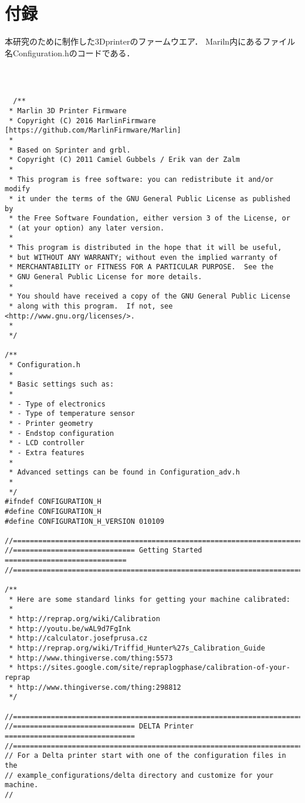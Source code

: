 \chapter{付録}
\label{chp:first}
本研究のために制作した3Dprinterのファームウエア．
Mariln内にあるファイル名Configuration.hのコードである． 


\begin{lstlisting}



  /**
 * Marlin 3D Printer Firmware
 * Copyright (C) 2016 MarlinFirmware [https://github.com/MarlinFirmware/Marlin]
 *
 * Based on Sprinter and grbl.
 * Copyright (C) 2011 Camiel Gubbels / Erik van der Zalm
 *
 * This program is free software: you can redistribute it and/or modify
 * it under the terms of the GNU General Public License as published by
 * the Free Software Foundation, either version 3 of the License, or
 * (at your option) any later version.
 *
 * This program is distributed in the hope that it will be useful,
 * but WITHOUT ANY WARRANTY; without even the implied warranty of
 * MERCHANTABILITY or FITNESS FOR A PARTICULAR PURPOSE.  See the
 * GNU General Public License for more details.
 *
 * You should have received a copy of the GNU General Public License
 * along with this program.  If not, see <http://www.gnu.org/licenses/>.
 *
 */

/**
 * Configuration.h
 *
 * Basic settings such as:
 *
 * - Type of electronics
 * - Type of temperature sensor
 * - Printer geometry
 * - Endstop configuration
 * - LCD controller
 * - Extra features
 *
 * Advanced settings can be found in Configuration_adv.h
 *
 */
#ifndef CONFIGURATION_H
#define CONFIGURATION_H
#define CONFIGURATION_H_VERSION 010109

//===========================================================================
//============================= Getting Started =============================
//===========================================================================

/**
 * Here are some standard links for getting your machine calibrated:
 *
 * http://reprap.org/wiki/Calibration
 * http://youtu.be/wAL9d7FgInk
 * http://calculator.josefprusa.cz
 * http://reprap.org/wiki/Triffid_Hunter%27s_Calibration_Guide
 * http://www.thingiverse.com/thing:5573
 * https://sites.google.com/site/repraplogphase/calibration-of-your-reprap
 * http://www.thingiverse.com/thing:298812
 */

//===========================================================================
//============================= DELTA Printer ===============================
//===========================================================================
// For a Delta printer start with one of the configuration files in the
// example_configurations/delta directory and customize for your machine.
//


\end{lstlisting}
